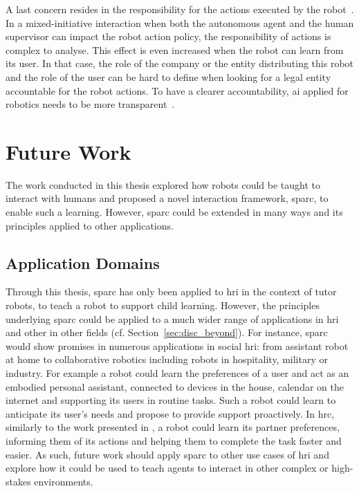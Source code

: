 A last concern resides in the responsibility for the actions executed by the robot~\citep{asaro2007robots}. In a mixed-initiative interaction when both the autonomous agent and the human supervisor can impact the robot action policy, the responsibility of actions is complex to analyse. This effect is even increased when the robot can learn from its user. In that case, the role of the company or the entity distributing this robot and the role of the user can be hard to define when looking for a legal entity accountable for the robot actions. To have a clearer accountability, \gls{ai} applied for robotics needs to be more transparent~\citep{wachter2017transparent}.

\section{Future Work}


The work conducted in this thesis explored how robots could be taught to interact with humans and proposed a novel interaction framework, \gls{sparc}, to enable such a learning. However, \gls{sparc} could be extended in many ways and its principles applied to other applications.

\subsection{Application Domains}

Through this thesis, \gls{sparc} has only been applied to \gls{hri} in the context of tutor robots, to teach a robot to support child learning. However, the principles underlying \gls{sparc} could be applied to a much wider range of applications in \gls{hri} and other in other fields (cf. Section~\ref{sec:disc_beyond}). For instance, \gls{sparc} would show promises in numerous applications in social \gls{hri}: from assistant robot at home to collaborative robotics including robots in hospitality, military or industry. For example a robot could learn the preferences of a user and act as an embodied personal assistant, connected to devices in the house, calendar on the internet and supporting its users in routine tasks. Such a robot could learn to anticipate its user's needs and propose to provide support proactively. In \gls{hrc}, similarly to the work presented in \cite{munzer2017efficient}, a robot could learn its partner preferences, informing them of its actions and helping them to complete the task faster and easier. As such, future work should apply \gls{sparc} to other use cases of \gls{hri} and explore how it could be used to teach agents to interact in other complex or high-stakes environments.

